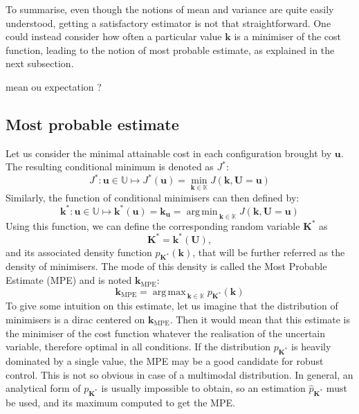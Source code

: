 \documentclass[preprint, 1p]{elsarticle}
\DeclareMathOperator*{\argmin}{arg\,min \,}
\DeclareMathOperator*{\argmax}{arg\,max \,}
\newcommand{\kmpe}{{\mathbf{k}}_{\mathrm{MPE}}}
\newcommand{\Kspace}{\mathbb{K}}
\newcommand{\Uspace}{\mathbb{U}}
\begin{document}
To summarise, even though the notions of mean and variance are quite easily understood, getting a satisfactory estimator is not that straightforward. One could instead consider how often a particular value $\mathbf{k}$ is a minimiser of the cost function, leading to the notion of most probable estimate, as explained in the next subsection.

{\color{red} mean ou expectation ?}

\subsection{Most probable estimate}
Let us consider the minimal attainable cost in each configuration brought by $\mathbf{u}$.
The resulting conditional minimum is denoted as $J^*$:
\begin{equation}
\label{eq:def_Jstar}
J^*: \mathbf{u} \in\Uspace \longmapsto J^*(\mathbf{u}) = \min_{\mathbf{k}\in \Kspace} J(\mathbf{k},\mathbf{U}=\mathbf{u})
\end{equation}
Similarly, the function of conditional minimisers can then defined by:
  \begin{equation}
  \label{eq:conditional_minimiser}
   \mathbf{k}^*: \mathbf{u}\in\Uspace \longmapsto \mathbf{k}^*(\mathbf{u}) = \mathbf{k}_{\mathbf{u}}=  \argmin_{{\mathbf{k}}\in\Kspace} J({\mathbf{k}},\mathbf{U}=\mathbf{u})
  \end{equation}
Using this function, we can define the corresponding random variable $\mathbf{K}^*$ as
  \begin{equation}
    \label{eq:def_study_minimisers}
    \mathbf{K}^*= \mathbf{k}^*(\mathbf{U}),
  \end{equation}
and its associated density function $p_{\mathbf{K}^*}(\mathbf{k})$, that will be further referred as the density of minimisers.
The mode of this density is called the Most Probable Estimate (MPE) and is noted  $\kmpe$:
\begin{equation}
  \label{eq:MPE}
  \kmpe = \argmax_{\mathbf{k} \in\Kspace} p_{\mathbf{K}^*}(\mathbf{k}) 
\end{equation}
To give some intuition on this estimate, let us imagine that the distribution of minimisers is a dirac centered on $\kmpe$. Then it would mean that this estimate is the minimiser of the cost function whatever the realisation of the uncertain variable, therefore optimal in all conditions. 
If the distribution $p_{\mathbf{K}^*}$ is heavily dominated by a single value, the MPE may be a good candidate for robust control. This is not so obvious in case of a multimodal distribution. 
In general, an analytical form of $p_{\mathbf{K}^*}$ is usually impossible to obtain, so an estimation $\hat{p}_{\mathbf{K}^*}$ must be used, and its maximum computed to get the MPE.
\end{document}
